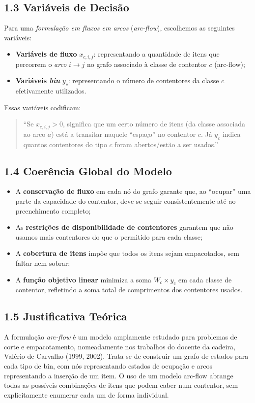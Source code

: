 \documentclass[a4paper,12pt]{article}
\begin{document}
\subsection*{1.3 Variáveis de Decisão}
Para uma \emph{formulação em fluxos em arcos} (\emph{arc-flow}), escolhemos as seguintes variáveis:
\begin{itemize}
    \item \textbf{Variáveis de fluxo} $x_{c,i,j}$: representando a quantidade de itens que percorrem o \emph{arco} $i \to j$ no grafo associado à classe de contentor $c$ (arc-flow);
    \item \textbf{Variáveis \emph{bin}} $y_c$: representando o número de contentores da classe $c$ efetivamente utilizados.
\end{itemize}
Essas variáveis codificam:
\begin{quote}
    ``Se $x_{c,i,j} > 0$, significa que um certo número de itens (da classe associada ao arco $a$) está a transitar naquele ``espaço'' no contentor $c$. Já $y_c$ indica quantos contentores do tipo $c$ foram abertos/estão a ser usados.''
\end{quote}

\subsection*{1.4 Coerência Global do Modelo}
\begin{itemize}
    \item A \textbf{conservação de fluxo} em cada nó do grafo garante que, ao ``ocupar'' uma parte da capacidade do contentor, deve-se seguir consistentemente até ao preenchimento completo;
    \item As \textbf{restrições de disponibilidade de contentores} garantem que não usamos mais contentores do que o permitido para cada classe;
    \item A \textbf{cobertura de itens} impõe que todos os itens sejam empacotados, sem faltar nem sobrar;
    \item A \textbf{função objetivo linear} minimiza a soma $W_c \times y_c$ em cada classe de contentor, refletindo a soma total de comprimentos dos contentores usados.
\end{itemize}

\subsection*{1.5 Justificativa Teórica}
A formulação \emph{arc-flow} é um modelo amplamente estudado para problemas de corte e empacotamento, nomeadamente nos trabalhos do docente da cadeira, Valério de Carvalho (1999, 2002). Trata-se de construir um grafo de estados para cada tipo de bin, com nós representando estados de ocupação e arcos representando a inserção de um item. O uso de um modelo arc-flow abrange todas as possíveis combinações de itens que podem caber num contentor, sem explicitamente enumerar cada um de forma individual.
\end{document}
